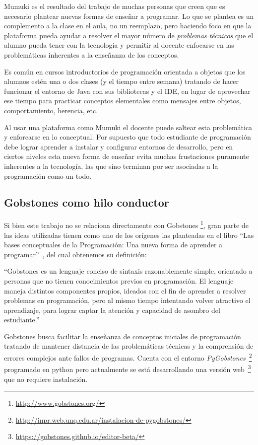 Mumuki es el resultado del trabajo de muchas personas que creen
que es necesario plantear nuevas formas de enseñar a programar.
Lo que se plantea es un complemento a la clase en el aula, no
un reemplazo, pero haciendo foco en que la plataforma pueda ayudar
a resolver el mayor número de \textit{problemas técnicos}
que el alumno pueda tener con la tecnología y permitir al docente enfocarse
en las problemáticas inherentes a la enseñanza de los conceptos.

Es común en cursos introductorios de programación orientada a objetos que los alumnos
estén una o dos clases (y el tiempo entre semana) tratando de hacer funcionar
el entorno de Java con sus bibliotecas y el IDE, en lugar de
aprovechar ese tiempo para practicar conceptos elementales como mensajes
entre objetos, comportamiento, herencia, etc.

Al usar una plataforma como Mumuki el docente puede saltear esta problemática
y enforcarse en lo conceptual. Por supuesto que todo estudiante de programación
debe lograr aprender a instalar y configurar entornos de desarrollo, pero
en ciertos niveles esta nueva forma de enseñar evita muchas
frustaciones puramente inherentes a la tecnología,
las que sino terminan por ser asociadas a la programación como un todo.

\subsection{Gobstones como hilo conductor}

Si bien este trabajo no se relaciona directamente con Gobstones
\footnote{\url{http://www.gobstones.org/}},
gran parte de las ideas utilizadas tienen como uno
de los orígenes las planteadas en el libro
\enquote{Las bases conceptuales de la Programación: Una nueva forma de aprender a programar}~\cite{LibroGobstones}, del cual obtenemos su definición:

\begin{displayquote}
``Gobstones es un lenguaje conciso de sintaxis razonablemente simple,
orientado a personas que no tienen conocimientos previos en programación.
El lenguaje maneja distintos componentes propios, ideados con el fin de
aprender a resolver problemas en programación,  pero al mismo tiempo
intentando volver atractivo el aprendizaje, para lograr captar la atención
y capacidad de asombro del estudiante.''
\end{displayquote}

Gobstones busca facilitar la enseñanza de conceptos iniciales de programación
tratando de mantener distancia de las problemáticas técnicas y
la comprensión de errores complejos ante fallos de programas.
Cuenta con el entorno \textit{PyGobstones}~\footnote{\url{http://inpr.web.unq.edu.ar/instalacion-de-pygobstones/}} programado en python
pero actualmente se está desarrollando una versión web~\footnote{\url{https://gobstones.github.io/editor-beta/}} que no requiere instalación.


